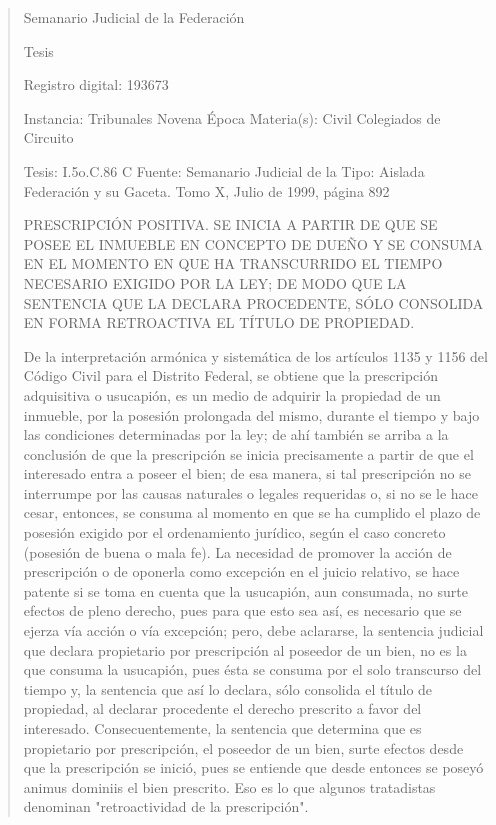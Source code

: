 \documentclass[11pt,a4paper]{article}
\begin{document}
\begin{quote}
                                                   Semanario Judicial de la Federación

                                                  Tesis

 Registro digital: 193673

 Instancia: Tribunales            Novena Época                          Materia(s): Civil
 Colegiados de Circuito

 Tesis: I.5o.C.86 C               Fuente: Semanario Judicial de la      Tipo: Aislada
                                  Federación y su Gaceta.
                                  Tomo X, Julio de 1999, página 892


PRESCRIPCIÓN POSITIVA. SE INICIA A PARTIR DE QUE SE POSEE EL INMUEBLE EN
CONCEPTO DE DUEÑO Y SE CONSUMA EN EL MOMENTO EN QUE HA TRANSCURRIDO EL
TIEMPO NECESARIO EXIGIDO POR LA LEY; DE MODO QUE LA SENTENCIA QUE LA
DECLARA PROCEDENTE, SÓLO CONSOLIDA EN FORMA RETROACTIVA EL TÍTULO DE
PROPIEDAD.


De la interpretación armónica y sistemática de los artículos 1135 y 1156 del Código Civil para el
Distrito Federal, se obtiene que la prescripción adquisitiva o usucapión, es un medio de adquirir la
propiedad de un inmueble, por la posesión prolongada del mismo, durante el tiempo y bajo las
condiciones determinadas por la ley; de ahí también se arriba a la conclusión de que la prescripción
se inicia precisamente a partir de que el interesado entra a poseer el bien; de esa manera, si tal
prescripción no se interrumpe por las causas naturales o legales requeridas o, si no se le hace
cesar, entonces, se consuma al momento en que se ha cumplido el plazo de posesión exigido por el
ordenamiento jurídico, según el caso concreto (posesión de buena o mala fe). La necesidad de
promover la acción de prescripción o de oponerla como excepción en el juicio relativo, se hace
patente si se toma en cuenta que la usucapión, aun consumada, no surte efectos de pleno derecho,
pues para que esto sea así, es necesario que se ejerza vía acción o vía excepción; pero, debe
aclararse, la sentencia judicial que declara propietario por prescripción al poseedor de un bien, no
es la que consuma la usucapión, pues ésta se consuma por el solo transcurso del tiempo y, la
sentencia que así lo declara, sólo consolida el título de propiedad, al declarar procedente el derecho
prescrito a favor del interesado. Consecuentemente, la sentencia que determina que es propietario
por prescripción, el poseedor de un bien, surte efectos desde que la prescripción se inició, pues se
entiende que desde entonces se poseyó animus dominiis el bien prescrito. Eso es lo que algunos
tratadistas denominan "retroactividad de la prescripción".


\end{quote}
\end{document}
